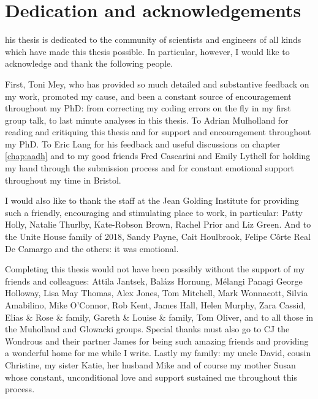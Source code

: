 %
%

\chapter*{Dedication and acknowledgements}
\begin{SingleSpace}
his thesis is dedicated to the community of scientists and engineers of all kinds which have made this thesis possible. In particular, however, I would like to acknowledge and thank the following people. 

First, Toni Mey, who has provided so much detailed and substantive feedback on my work, promoted my cause, and been a constant source of encouragement throughout my PhD: from correcting my coding errors on the fly in my first group talk, to last minute analyses in this thesis. To Adrian Mulholland for reading and critiquing this thesis and for support and encouragement throughout my PhD. To Eric Lang for his feedback and useful discussions on chapter \ref{chap:aadh} and to my good friends Fred Cascarini and Emily Lythell for holding my hand through the submission process and for constant emotional support throughout my time in Bristol.  

I would also like to thank the staff at the Jean Golding Institute for providing such a friendly, encouraging and stimulating place to work, in particular: Patty Holly, Natalie Thurlby, Kate-Robson Brown, Rachel Prior and Liz Green. And to the Unite House family of 2018, Sandy Payne, Cait Houlbrook, Felipe C\^{o}rte Real De Camargo and the others: it was emotional. 

Completing this thesis would not have been possibly without the support of my friends and colleagues: Attila Jantsek, Bal\'azs Hornung, M\'{e}langi Panagi George Holloway, Lisa May Thomas, Alex Jones, Tom Mitchell, Mark Wonnacott, Silvia Amabilino, Mike O'Connor, Rob Kent, James Hall,  Helen Murphy, Zara Cassid, Elias \& Rose \& family, Gareth \& Louise \& family, Tom Oliver, and to all those in the Muholland and Glowacki groups. Special thanks must also go to CJ the Wondrous and their partner James for being such amazing friends and providing a wonderful home for me while I write. Lastly my family: my uncle David, cousin Christine, my sister Katie, her husband Mike and of course my mother Susan whose constant, unconditional love and support sustained me throughout this process. 

\end{SingleSpace}
\clearpage